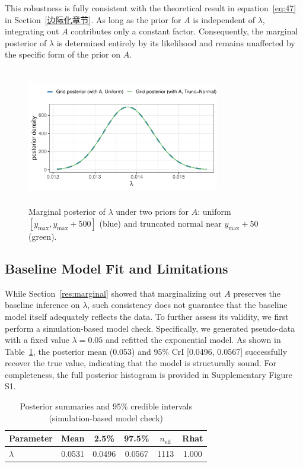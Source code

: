 This robustness is fully consistent with the theoretical result in equation~\eqref{eq:47} in Section~\ref{边际化章节}. As long as the prior for $A$ is independent of $\lambda$, integrating out $A$ contributes only a constant factor. Consequently, the marginal posterior of $\lambda$ is determined entirely by its likelihood and remains unaffected by the specific form of the prior on $A$.
\begin{figure}[H]
    \centering
    \includegraphics[height=6cm, width=0.75\textwidth]{images/diff_A_prior_marginal_compare.pdf}
    \caption{{\small Marginal posterior of $\lambda$ under two priors for $A$: uniform $[y_{\max}, y_{\max}+500]$ (blue) and truncated normal near $y_{\max}+50$ (green).}}
    \label{fig:diff_A_marginal}
\end{figure}

\subsection{Baseline Model Fit and Limitations}
\label{res:baseline_ecdf}
While Section~\ref{res:marginal} showed that marginalizing out $A$ preserves the baseline inference on $\lambda$, such consistency does not guarantee that the baseline model itself adequately reflects the data. To further assess its validity, we first perform a simulation-based model check. Specifically, we generated pseudo-data with a fixed value $\lambda=0.05$ and refitted the exponential model. As shown in Table~\ref{tab:post-ci}, the posterior mean (0.053) and 95\% CrI [0.0496, 0.0567] successfully recover the true value, indicating that the model is structurally sound. For completeness, the full posterior histogram is provided in Supplementary Figure S1.
\begin{table}[H]
\centering
\caption{{\small Posterior summaries and 95\% credible intervals (simulation-based model check)}}
\label{tab:post-ci}
\small
\begin{tabular}{lccccc}
\toprule
{Parameter} & {Mean} & {2.5\%} & {97.5\%} & {$n_{\text{eff}}$} & {Rhat} \\
\midrule
$\lambda$   & 0.0531 & 0.0496 & 0.0567 & 1113 & 1.000 \\
\bottomrule
\end{tabular}
\end{table}


